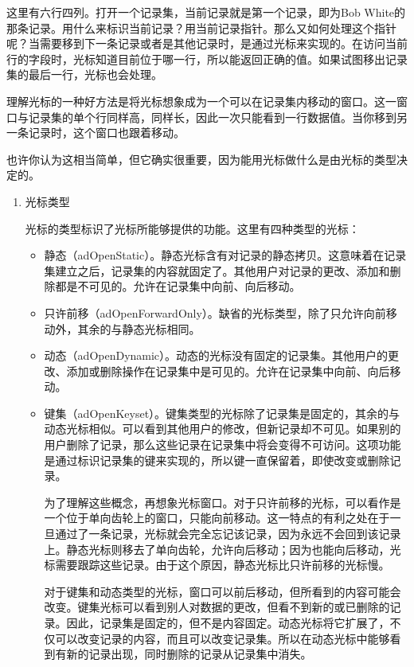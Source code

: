     这里有六行四列。打开一个记录集，当前记录就是第一个记录，即为Bob White的那条记录。用什么来标识当前记录？用当前记录指针。那么又如何处理这个指针呢？当需要移到下一条记录或者是其他记录时，是通过光标来实现的。在访问当前行的字段时，光标知道目前位于哪一行，所以能返回正确的值。如果试图移出记录集的最后一行，光标也会处理。

    理解光标的一种好方法是将光标想象成为一个可以在记录集内移动的窗口。这一窗口与记录集的单个行同样高，同样长，因此一次只能看到一行数据值。当你移到另一条记录时，这个窗口也跟着移动。

    也许你认为这相当简单，但它确实很重要，因为能用光标做什么是由光标的类型决定的。
\begin{enumerate}
	\item  光标类型

光标的类型标识了光标所能够提供的功能。这里有四种类型的光标：
\begin{itemize}
	\item  静态（adOpenStatic）。静态光标含有对记录的静态拷贝。这意味着在记录集建立之后，记录集的内容就固定了。其他用户对记录的更改、添加和删除都是不可见的。允许在记录集中向前、向后移动。

\item 只许前移（adOpenForwardOnly）。缺省的光标类型，除了只允许向前移动外，其余的与静态光标相同。

\item 动态（adOpenDynamic）。动态的光标没有固定的记录集。其他用户的更改、添加或删除操作在记录集中是可见的。允许在记录集中向前、向后移动。

\item 键集（adOpenKeyset）。键集类型的光标除了记录集是固定的，其余的与动态光标相似。可以看到其他用户的修改，但新记录却不可见。如果别的用户删除了记录，那么这些记录在记录集中将会变得不可访问。这项功能是通过标识记录集的键来实现的，所以键一直保留着，即使改变或删除记录。

为了理解这些概念，再想象光标窗口。对于只许前移的光标，可以看作是一个位于单向齿轮上的窗口，只能向前移动。这一特点的有利之处在于一旦通过了一条记录，光标就会完全忘记该记录，因为永远不会回到该记录上。静态光标则移去了单向齿轮，允许向后移动；因为也能向后移动，光标需要跟踪这些记录。由于这个原因，静态光标比只许前移的光标慢。

对于键集和动态类型的光标，窗口可以前后移动，但所看到的内容可能会改变。键集光标可以看到别人对数据的更改，但看不到新的或已删除的记录。因此，记录集是固定的，但不是内容固定。动态光标将它扩展了，不仅可以改变记录的内容，而且可以改变记录集。所以在动态光标中能够看到有新的记录出现，同时删除的记录从记录集中消失。


\end{itemize}
\end{enumerate}
